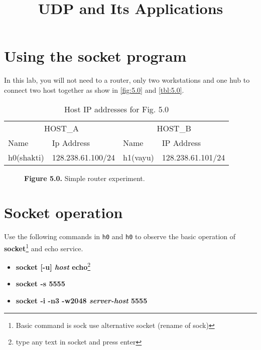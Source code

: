 \documentclass{../UTNetLab}
\title{UDP and Its Applications}
\author{%
    Dr. Ahmad Khonsari - \FR{دکتر احمد خونساری}\\
    \href{mailto:a_khonsari@ut.ac.ir}{a\_khonsari@ut.ac.ir}\\
    \vskip 1.5em%
    Amir Haji Ali Khamseh'i - \FR{امیر حاجی‌علی‌خمسه‌ء}\\
    \href{mailto:khamse@ut.ac.ir}{khamse@ut.ac.ir}\\
    \vskip 1.5em%
    \href{mailto:m.borhani@ut.ac.ir}{Muhammad Borhani} - \FR{محمد برهانی}\\
    \href{mailto:a.a.khordadi@ut.ac.ir}{Amirahmad Khordadi} - \FR{امیراحمد خردادی}\\
    \href{mailto:sina\_kashipazha@ut.ac.ir}{Sina Kashi pazha} - \FR{سینا کاشی‌پزها}
}
\begin{document}
    \maketitle

\section*{Using the socket program}
\label{sec:schema}
	In this lab, you will not need to a router, only two workstations and one hub to connect two host together as show in \autoref{fig:5.0} and \autoref{tbl:5.0}.
	\begin{table}[H]
		\caption{Host IP addresses for Fig. 5.0}
		\label{tbl:5.0}
        \vspace{5pt}
        \centering
        \large
        \begin{tabular}{ *4l }
            \hline \hline
            \multicolumn{2}{c}{HOST\_A} & \multicolumn{2}{c}{HOST\_B} \\
            Name & Ip Address & Name & IP Address \\
            \hline 
            h0(shakti) & 128.238.61.100/24 & h1(vayu) & 128.238.61.101/24\\
            \hline \hline
            \end{tabular}
    \end{table}

    \begin{figure}[H]
        \centering
		\caption{\textbf{Figure 5.0.} Simple router experiment.}        
		\label{fig:5.0}
    \end{figure}

\section{Socket operation}
	Use the following commands in \texttt{h0} and \texttt{h0} to observe the basic operation of \textbf{socket}\footnote{Basic command is sock use alternative socket (rename of sock)} and echo service.
	\begin{itemize}
		\item \textbf{socket [-u] \textit{host} echo}\footnote{type any text in socket and press enter}
		\item \textbf{socket -s 5555}
		\item \textbf{socket -i -n3 -w2048 \textit{server-host} 5555}
	\end{itemize}
\end{document}
